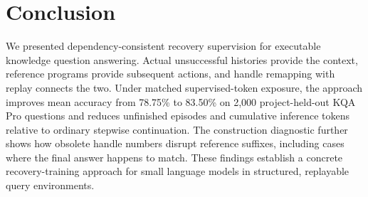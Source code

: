 \section{Conclusion}

We presented dependency-consistent recovery supervision for executable knowledge question answering. Actual unsuccessful histories provide the context, reference programs provide subsequent actions, and handle remapping with replay connects the two. Under matched supervised-token exposure, the approach improves mean accuracy from 78.75\% to 83.50\% on 2,000 project-held-out KQA Pro questions and reduces unfinished episodes and cumulative inference tokens relative to ordinary stepwise continuation. The construction diagnostic further shows how obsolete handle numbers disrupt reference suffixes, including cases where the final answer happens to match. These findings establish a concrete recovery-training approach for small language models in structured, replayable query environments.
